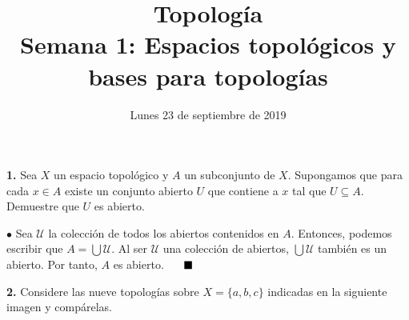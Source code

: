 \documentclass{article}
\begin{document}
\date{Lunes 23 de septiembre de 2019}
\title{ \textbf{Topología} \\
Semana 1: Espacios topológicos y bases para topologías}
\maketitle	
\begin{mybox}
	\textbf{1. }  Sea $X$ un espacio topológico y $A$ un subconjunto de $X$. Supongamos que para cada $x \in A$ existe un conjunto abierto $U$ que contiene a $x$ tal que $U \subseteq A$. Demuestre que $U$ es abierto. 
\end{mybox}	

$\bullet$ Sea $\mathcal{U}$ la colección de todos los abiertos contenidos en $A$. Entonces, podemos escribir que
$A =  \bigcup \mathcal{U} . $ Al ser $\mathcal{U}$ una colección de abiertos, $\bigcup \mathcal{U}$ también es un abierto. Por tanto, $A$ es abierto. $\hspace{0.5cm} \blacksquare$


\begin{mybox}
	\textbf{2. }Considere las nueve topologías sobre $X = \{ a, b, c\}$  indicadas en la siguiente imagen y compárelas.  
\end{mybox}	
\end{document}
